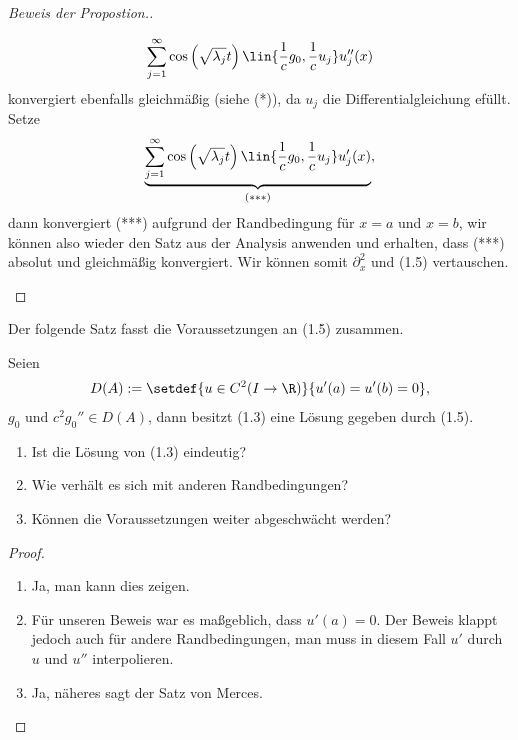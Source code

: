 \begin{proof}[Beweis der Propostion.]
\begin{enumerate}[label=\arabic{*}.)]
\begin{align*}
\sum\limits_{j=1}^\infty
\cos\left(\sqrt{\lambda_j}t\right)\lin{\frac{1}{c}g_0,\frac{1}{c}u_j}u_j''(x)
\end{align*}
konvergiert ebenfalls gleichmäßig (siehe (*)), da $u_j$ die
Differentialgleichung efüllt. Setze
\begin{align*}
\underbrace{\sum\limits_{j=1}^\infty
\cos\left(\sqrt{\lambda_j}t\right)\lin{\frac{1}{c}g_0,\frac{1}{c}u_j}u_j'(x)}_{(***)},
\end{align*}
dann konvergiert (***) aufgrund der Randbedingung für $x=a$ und $x=b$, wir
können also wieder den Satz aus der Analysis anwenden und erhalten, dass (***)
absolut und gleichmäßig konvergiert. Wir können somit $\partial_x^2$ und (1.5)
vertauschen.\qedhere
\end{enumerate}
\end{proof}

Der folgende Satz fasst die Voraussetzungen an (1.5) zusammen.
\begin{prop}
\label{prop:1.46}
Seien
\begin{align*}
D(A):= \setdef{u\in C^2(I\to\R)}{u'(a) = u'(b)= 0},
\end{align*}
$g_0$ und $c^2g_0''\in D(A)$, dann besitzt (1.3) eine Lösung gegeben
durch (1.5).\fishhere
\end{prop}

\begin{prop}
\label{prop:1.47}
\begin{enumerate}[label=\arabic{*}.)]
  \item Ist die Lösung von (1.3) eindeutig?
  \item Wie verhält es sich mit anderen Randbedingungen?
  \item Können die Voraussetzungen weiter abgeschwächt werden?\fishhere
\end{enumerate}
\end{prop}
\begin{proof}
\begin{enumerate}[label=\arabic{*}.)]
  \item Ja, man kann dies zeigen.
  \item Für unseren Beweis war es maßgeblich, dass $u'(a) = 0$. Der Beweis
  klappt jedoch auch für andere Randbedingungen, man muss in diesem Fall $u'$
  durch $u$ und $u''$ interpolieren.
  \item Ja, näheres sagt der Satz von Merces.\qedhere
\end{enumerate}
\end{proof}

